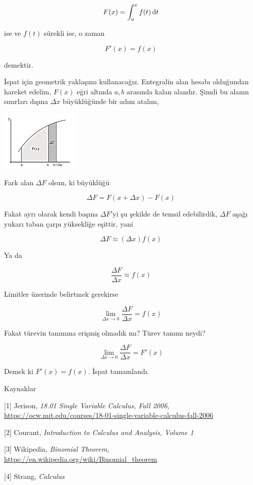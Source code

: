 \documentclass[12pt,fleqn]{article}\usepackage{../../common}
\begin{document}
$$
F(x) = \int _{a}^{x} f(t)\,\mathrm{d} t 
$$

ise ve $f(t)$ sürekli ise, o zaman

$$
F'(x) = f(x)
$$

demektir.

İspat için geometrik yaklaşımı kullanacağız. Entegralin alan hesabı olduğundan
hareket edelim, $F(x)$ eğri altında $a,b$ arasında kalan alandır. Şimdi bu
alanın sınırları dışına $\Delta x$ büyüklüğünde bir adım atalım, 

\includegraphics[width=10em]{ode_mattuck_65_diffint1_05.jpg}

Fark alan $\Delta F$ olsun, ki büyüklüğü

$$
\Delta F = F(x + \Delta x) - F(x)
$$

Fakat ayrı olarak kendi başına $\Delta F$'yi şu şekilde de temsil edebilirdik,
$\Delta F$ aşağı yukarı taban çarpı yüksekliğe eşittir, yani

$$
\Delta F \approx (\Delta x) f(x)
$$

Ya da

$$
\frac{\Delta F}{\Delta x} \approx f(x)
$$

Limitler üzerinde belirtmek gerekirse

$$
\lim_{\Delta x \to 0} \frac{\Delta F}{\Delta x} = f(x)
$$

Fakat türevin tanımına erişmiş olmadık mı? Türev tanımı neydi?

$$
\lim_{\Delta x \to 0} \frac{\Delta F}{\Delta x} = F'(x)
$$

Demek ki $F'(x) = f(x)$. İspat tamamlandı.

Kaynaklar

[1] Jerison, {\em 18.01 Single Variable Calculus, Fall 2006},
    \url{https://ocw.mit.edu/courses/18-01-single-variable-calculus-fall-2006}

[2] Courant, {\em Introduction to Calculus and Analysis, Volume 1}

[3] Wikipedia, {\em Binomial Theorem},
    \url{https://en.wikipedia.org/wiki/Binomial_theorem}
    
[4] Strang, {\em Calculus}
\end{document}
